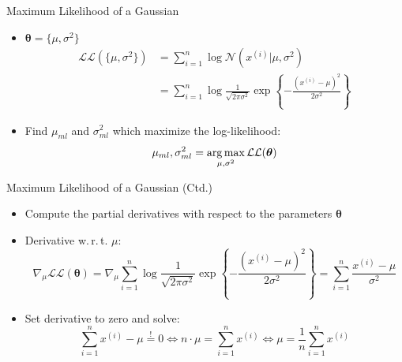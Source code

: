 \begin{frame}{Maximum Likelihood of a Gaussian}{}
	\begin{itemize}
		\item $\bm{\theta} = \{ \mu, \sigma^2 \}$
		\begin{align*}
			\mathcal{L}\mathcal{L}(\{ \mu, \sigma^2 \})
				&= \sum_{i=1}^n \log \mathcal{N}(x^{(i)} \vert \mu, \sigma^2) \\
				&= \sum_{i=1}^n \log \frac{1}{\sqrt{2 \pi \sigma^2}} \exp\left\{ -\frac{(x^{(i)} - \mu)^2}{2 \sigma^2} \right\}
		\end{align*}
		\item Find $\mu_{ml}$ and $\sigma_{ml}^2$ which maximize the log-likelihood:
		\begin{equation*}
			\mu_{ml}, \sigma_{ml}^2 = \operatorname*{arg\,max}_{\mu, \sigma^2} \mathcal{L}\mathcal{L}(\bm{\theta})
		\end{equation*}
	\end{itemize}
\end{frame}


\begin{frame}{Maximum Likelihood of a Gaussian (Ctd.)}{}
	\begin{itemize}
		\item Compute the partial derivatives with respect to the parameters $\bm{\theta}$
		\item Derivative w.\,r.\,t. $\mu$:
		\begin{equation*}
			\nabla_{\mu}\mathcal{L}\mathcal{L}(\bm{\theta})
				= \nabla_{\mu} \sum_{i=1}^n \log \frac{1}{\sqrt{2 \pi \sigma^2}} \exp\left\{ -\frac{(x^{(i)} - \mu)^2}{2 \sigma^2} \right\}
				= \sum_{i=1}^n \frac{x^{(i)} - \mu}{\sigma^2}
		\end{equation*}
		\item Set derivative to zero and solve:
		\begin{equation*}
			\sum_{i=1}^n x^{(i)} - \mu \overset{!}{=} 0
				\Leftrightarrow n \cdot \mu = \sum_{i=1}^n x^{(i)}
				\Leftrightarrow \mu = \frac{1}{n} \sum_{i=1}^n x^{(i)}
 		\end{equation*}
	\end{itemize}
\end{frame}


